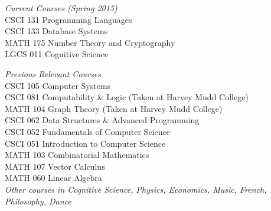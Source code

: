 {\sl Current Courses (Spring 2015)} \\
CSCI 131 Programming Languages \\
CSCI 133 Database Systems \\
MATH 175 Number Theory and Cryptography \\
LGCS 011 Cognitive Science

{\sl Previous Relevant Courses} \\
CSCI 105 Computer Systems\\
CSCI 081 Computability \& Logic (Taken at Harvey Mudd College)\\
MATH 104 Graph Theory (Taken at Harvey Mudd College)\\
CSCI 062 Data Structures \& Advanced Programming \\
CSCI 052 Fundamentals of Computer Science \\
CSCI 051 Introduction to Computer Science \\
MATH 103 Combinatorial Mathematics \\
MATH 107 Vector Calculus \\
MATH 060 Linear Algebra  \\
\textit{Other courses in Cognitive Science, Physics, Economics, Music, French, Philosophy, Dance}
